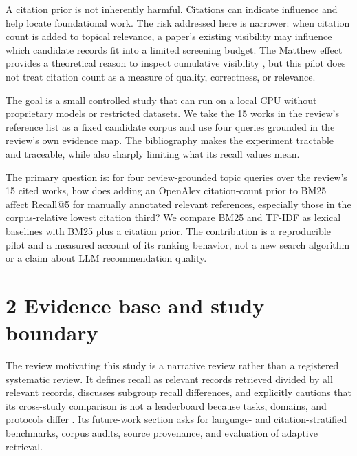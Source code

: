 \documentclass[acmsmall,nonacm]{acmart}
\begin{document}
A citation prior is not inherently harmful. Citations can indicate influence and help locate foundational work. The risk addressed here is narrower: when citation count is added to topical relevance, a paper's existing visibility may influence which candidate records fit into a limited screening budget. The Matthew effect provides a theoretical reason to inspect cumulative visibility \cite{merton1968}, but this pilot does not treat citation count as a measure of quality, correctness, or relevance.\par

The goal is a small controlled study that can run on a local CPU without proprietary models or restricted datasets. We take the 15 works in the review's reference list as a fixed candidate corpus and use four queries grounded in the review's own evidence map. The bibliography makes the experiment tractable and traceable, while also sharply limiting what its recall values mean.\par

The primary question is: for four review-grounded topic queries over the review's 15 cited works, how does adding an OpenAlex citation-count prior to BM25 affect Recall@5 for manually annotated relevant references, especially those in the corpus-relative lowest citation third? We compare BM25 and TF-IDF as lexical baselines with BM25 plus a citation prior. The contribution is a reproducible pilot and a measured account of its ranking behavior, not a new search algorithm or a claim about LLM recommendation quality.\par

\section*{2 Evidence base and study boundary}

The review motivating this study is a narrative review rather than a registered systematic review. It defines recall as relevant records retrieved divided by all relevant records, discusses subgroup recall differences, and explicitly cautions that its cross-study comparison is not a leaderboard because tasks, domains, and protocols differ \cite{mahali2026review}. Its future-work section asks for language- and citation-stratified benchmarks, corpus audits, source provenance, and evaluation of adaptive retrieval.\par
\end{document}
